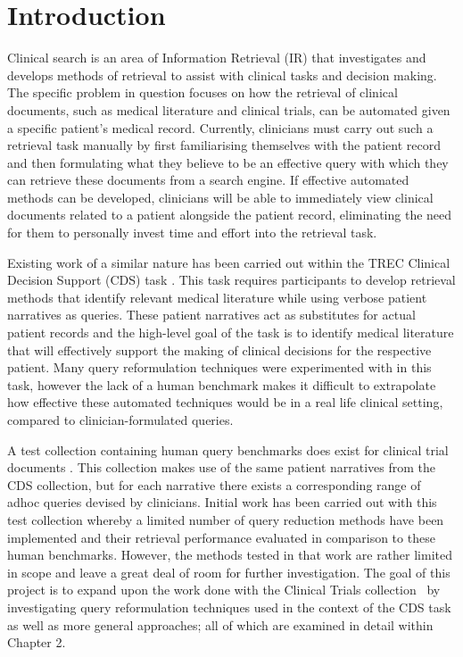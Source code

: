 \documentclass[a4paper]{report}
\begin{document}
\chapter{Introduction}
Clinical search is an area of Information Retrieval (IR) that investigates and develops methods of retrieval to assist with clinical tasks and decision making. The specific problem in question focuses on how the retrieval of clinical documents, such as medical literature and clinical trials, can be automated given a specific patient's medical record. Currently, clinicians must carry out such a retrieval task manually by first familiarising themselves with the patient record and then formulating what they believe to be an effective query with which they can retrieve these documents from a search engine. If effective automated methods can be developed, clinicians will be able to immediately view clinical documents related to a patient alongside the patient record, eliminating the need for them to personally invest time and effort into the retrieval task.

Existing work of a similar nature has been carried out within the TREC Clinical Decision Support (CDS) task \cite{Roberts2015Overview-of-the}. This task requires participants to develop retrieval methods that identify relevant medical literature while using verbose patient narratives as queries. These patient narratives act as substitutes for actual patient records and the high-level goal of the task is to identify medical literature that will effectively support the making of clinical decisions for the respective patient. Many query reformulation techniques were experimented with in this task, however the lack of a human benchmark makes it difficult to extrapolate how effective these automated techniques would be in a real life clinical setting, compared to clinician-formulated queries. 

A test collection containing human query benchmarks does exist for clinical trial documents \cite{Koopman2016A-Test-Collecti}. This collection makes use of the same patient narratives from the CDS collection, but for each narrative there exists a corresponding range of adhoc queries devised by clinicians. Initial work has been carried out with this test collection whereby a limited number of query reduction methods have been implemented and their retrieval performance evaluated in comparison to these human benchmarks. However, the methods tested in that work are rather limited in scope and leave a great deal of room for further investigation. The goal of this project is to expand upon the work done with the Clinical Trials collection~\cite{Koopman2016A-Test-Collecti} by investigating query reformulation techniques used in the context of the CDS task as well as more general approaches; all of which are examined in detail within Chapter 2.
\end{document}
